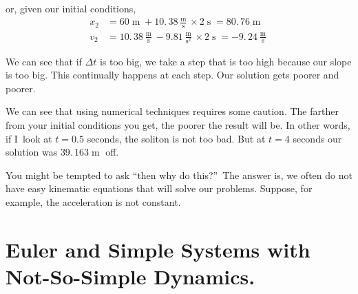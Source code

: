 \documentclass{book}
\begin{document}
or, given our initial conditions, \begin{align*}
x_{2}  & =60 \operatorname{m} +\allowbreak10.\,\allowbreak38\frac{ \operatorname{m} }{ \operatorname{s} }\times2 \operatorname{s} =\allowbreak80.\,\allowbreak76 \operatorname{m} \\
v_{2}  & =\allowbreak10.\,\allowbreak38\frac{ \operatorname{m} }{ \operatorname{s} }-9.81\frac{ \operatorname{m} }{ \operatorname{s} ^{2}}\times2 \operatorname{s} =\allowbreak-9.\,\allowbreak24\frac{ \operatorname{m} }{ \operatorname{s} } \end{align*} \begin{center}
\end{center}


We can see that if $\Delta t$ is too big, we take a step that is too high
because our slope is too big. This continually happens at each step. Our
solution gets poorer and poorer.

We can see that using numerical techniques requires some caution. The farther
from your initial conditions you get, the poorer the result will be. In other
words, if I\ look at $t=0.5$ seconds, the soliton is not too bad. But at $t=4$
seconds our solution was $\allowbreak39.\,\allowbreak163 \operatorname{m} $ off.

You might be tempted to ask \textquotedblleft then why do
this?\textquotedblright\ The answer is, we often do not have easy kinematic
equations that will solve our problems. Suppose, for example, the acceleration
is not constant.

\section{Euler and Simple Systems with Not-So-Simple Dynamics.}
\end{document}
